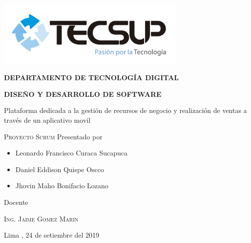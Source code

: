 \begin{titlepage}
	\centering
	\includegraphics[width=0.70\textwidth]{img/logo_tecsup_final}\par\vspace{1cm}
	\vspace{0.30cm}	
	{\scshape\large\bfseries DEPARTAMENTO DE TECNOLOG\'IA DIGITAL \par}
	\vspace{0.60cm}	
	{\scshape\large\bfseries DISEÑO Y DESARROLLO DE SOFTWARE  \par}
	\vspace{2.00cm}		
	{\large\large Plataforma dedicada a la gestión de recursos de negocio y realización de ventas a través de un aplicativo movil \par}
	\vspace{0.60cm}
	{\scshape\large Proyecto Scrum }
	\vspace{0.60cm}
	\vfill
	Presentado por \par
	{\large\itshape { 
		\begin{itemize}
			\item Leonardo Francisco Curaca Sucapuca
			\item Daniel Eddison Quispe Oscco
			\item Jhovin Maho Bonifacio Lozano
		\end{itemize} 
	}\par}
	\vspace{0.30cm}
	\vfill
	Docente \par
	\textsc{Ing. Jaime Gomez Marín}
	
  \vspace{0.30cm}
	\vfill
        {\large Lima , 24 de setiembre del 2019 \par}
\end{titlepage}

